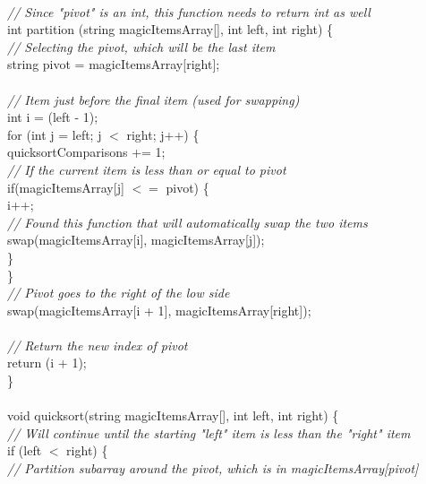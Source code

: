 \documentclass{article}
\begin{document}
\begin {linenumbers}
{\\
\textit{// Since "pivot" is an int, this function needs to return int as well\\}
int partition (string magicItemsArray[], int left, int right) \{\\
    \textit{\indent // Selecting the pivot, which will be the last item\\}
    \indent string pivot = magicItemsArray[right];\\
\\
    \textit{\indent // Item just before the final item (used for swapping)\\}
    \indent int i = (left - 1);\\
    \indent for (int j = left; j $<$ right; j++) \{\\
        \indent \indent quicksortComparisons += 1;\\
        \textit{\indent \indent // If the current item is less than or equal to pivot\\}
        \indent \indent if(magicItemsArray[j] $<=$ pivot) \{\\
            \indent \indent \indent i++;\\
            \textit{\indent \indent \indent // Found this function that will automatically swap the two items\\}
            \indent \indent \indent swap(magicItemsArray[i], magicItemsArray[j]);\\
        \indent \indent \}\\
    \indent \}\\
    \textit{\indent // Pivot goes to the right of the low side\\}
    \indent swap(magicItemsArray[i + 1], magicItemsArray[right]);\\
\\
    \textit{\indent // Return the new index of pivot\\}
    \indent return (i + 1);\\
\}\\
\\
void quicksort(string magicItemsArray[], int left, int right) \{\\
    \textit{\indent // Will continue until the starting "left" item is less than the "right" item\\}
    \indent if (left $<$ right) \{\\
        \textit{\indent \indent // Partition subarray around the pivot, which is in magicItemsArray[pivot]\\}
}
\end{linenumbers}
\end{document}

